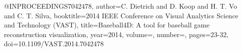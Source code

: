 @INPROCEEDINGS{7042478,
  author={C. {Dietrich} and D. {Koop} and H. T. {Vo} and C. T. {Silva}},
  booktitle={2014 IEEE Conference on Visual Analytics Science and Technology (VAST)}, 
  title={Baseball4D: A tool for baseball game reconstruction   visualization}, 
  year={2014},
  volume={},
  number={},
  pages={23-32},
  doi={10.1109/VAST.2014.7042478}}